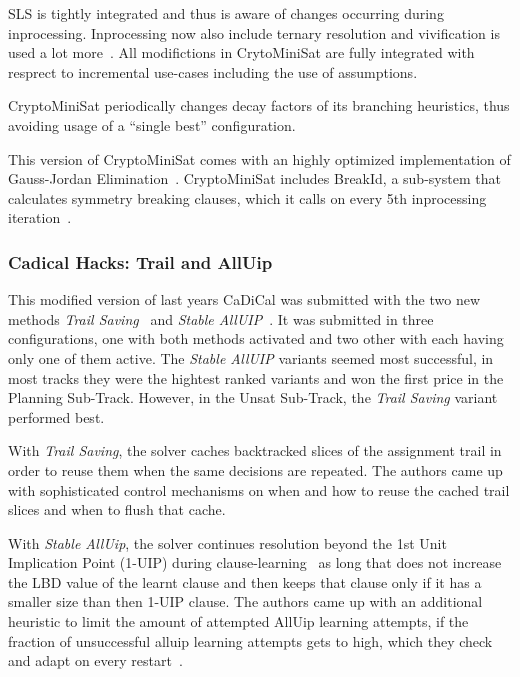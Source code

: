 \documentclass{elsarticle}
\begin{document}
SLS is tightly integrated and thus is aware of changes occurring during inprocessing. 
Inprocessing now also include ternary resolution and vivification is used a lot more~\cite{ChuMinLi:2020:Vivification}. 
All modifictions in CrytoMiniSat are fully integrated with resprect to incremental use-cases including the use of assumptions. 

CryptoMiniSat periodically changes decay factors of its branching heuristics, thus avoiding usage of a ``single best'' configuration.

This version of CryptoMiniSat comes with an highly optimized implementation of Gauss-Jordan Elimination~\cite{Soos:2020:CNFXOR}. 
CryptoMiniSat includes BreakId, a sub-system that calculates symmetry breaking clauses, which it calls on every 5th inprocessing iteration~\cite{Devriendt:2016:BreakId}.

\subsubsection{Cadical Hacks: Trail and AllUip}

This modified version of last years CaDiCal was submitted with the two new methods \emph{Trail Saving}~\cite{Hickey:2020:TrailSaving} and \emph{Stable AllUIP}~\cite{Bacchus:SC2020}. 
It was submitted in three configurations, one with both methods activated and two other with each having only one of them active. 
The \emph{Stable AllUIP} variants seemed most successful, in most tracks they were the hightest ranked variants and won the first price in the Planning Sub-Track. 
However, in the Unsat Sub-Track, the \emph{Trail Saving} variant performed best.

With \emph{Trail Saving}, the solver caches backtracked slices of the assignment trail in order to reuse them when the same decisions are repeated. 
The authors came up with sophisticated control mechanisms on when and how to reuse the cached trail slices and when to flush that cache. 

With \emph{Stable AllUip}, the solver continues resolution beyond the 1st Unit Implication Point (1-UIP) during clause-learning~\cite{Zhang:2001:ClauseLearning} as long that does not increase the LBD value of the learnt clause and then keeps that clause only if it has a smaller size than then 1-UIP clause. 
The authors came up with an additional heuristic to limit the amount of attempted AllUip learning attempts, if the fraction of unsuccessful alluip learning attempts gets to high, which they check and adapt on every restart~\cite{Bacchus:SC2020}. 
\end{document}
